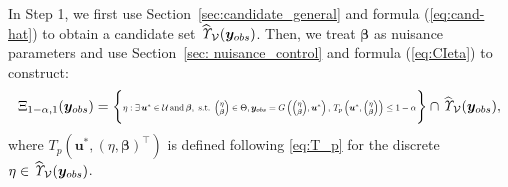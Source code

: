 \documentclass[12pt]{article}
\theoremstyle{shortspace}
\def\*#1{\bm{#1}}
\begin{document}
In Step 1,  we first use Section~\ref{sec:candidate_general} and formula (\ref{eq:cand-hat}) to obtain a candidate set $\widehat{\it \Upsilon}_{\mathcal V}(\*y_{obs})$. 
Then, we treat $\*\beta$ as nuisance parameters and use Section~\ref{sec: nuisance_control} and formula (\ref{eq:CIeta}) to construct:
\begin{equation}
\label{eq:CIeta1}
\Xi_{1-\alpha, 1}(\*y_{obs}) = \bigg\{ \resizebox{.61\textwidth}{!}{$\eta: \exists \, \*u^* \in {\mathcal U} \, \text{and} \, \*\beta, 
\text{ s.t. }  {\footnotesize \begin{pmatrix}\eta  \\ \*\beta
\end{pmatrix}}\in \Theta,  \*y_{obs} = 
G\left({\footnotesize\begin{pmatrix}\eta \\ \*\beta
\end{pmatrix}}, \*u^*\right),
\,
T_p\left(\*u^*, {\footnotesize\begin{pmatrix}\eta \\ \*\beta
\end{pmatrix}}\right) \leq 1-\alpha$} \bigg\} \cap \widehat{\it \Upsilon}_{\mathcal V}(\*y_{obs}),      
\end{equation}
where $T_p\left(\*u^*,(\eta, \*\beta)^\top \right) $ is defined following  \eqref{eq:T_p} for the discrete 
 $\eta \in \widehat{\it \Upsilon}_{\mathcal V}(\*y_{obs})$.  
\end{document}
